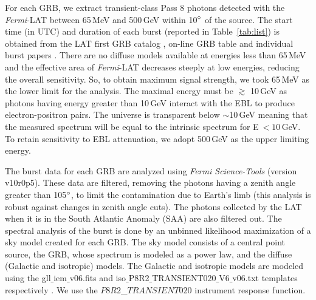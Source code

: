 \documentclass[12pt,preprint]{aastex}
\begin{document}
For each GRB, we {extract }transient-class Pass 8 photons detected with the {\it Fermi}-LAT 
between 65\,MeV and 500\,GeV within 10$\degree$ of the source.
The start time (in UTC) and duration of each burst (reported in Table~\ref{tab:list}) is obtained from
the LAT first GRB catalog \citep{lat_grbcat1}, on-line GRB
table\footnotemark{} and individual burst papers {\citep{lat_grb09,palmaetal,kd10,cutoff09,PLspect2013}}.
 {There are no diffuse models available at energies less than 65\,MeV and the effective area of {\it Fermi}-LAT decreases
steeply at low energies, reducing the overall sensitivity. So, to obtain maximum signal strength, we took 65\,MeV as the lower limit for the analysis.}
{The maximal energy }must be $\gtrsim$ 10\,GeV as photons having energy greater than 10\,GeV interact 
with the EBL to produce electron-positron pairs. The universe is transparent
below $\sim$10\,GeV \citep{stecker06} meaning that the measured
spectrum will {be} equal to the intrinsic spectrum for E$\ <10$\,GeV.
To retain sensitivity to EBL attenuation, we adopt 500\,GeV as the
upper limiting energy.




The burst data for each GRB are analyzed using {\it Fermi
Science-Tools} (version v10r0p5)\footnotemark{}.
These data are
filtered, removing the photons having a zenith angle greater than 105$\degree$,
to limit the
contamination due to Earth's limb {(this analysis is robust against changes in zenith angle cuts\footnotemark{})}.
The photons collected
by the LAT when it is in the South Atlantic Anomaly (SAA) are also filtered out. 
The spectral analysis of the burst is done by an unbinned likelihood maximization
of a sky model created for each GRB. The sky model consists of a central point source, 
the GRB, whose spectrum is modeled as a power law, and the diffuse (Galactic and isotropic) models.
The Galactic and isotropic models are modeled using the gll$\_$iem$\_$v06.fits and
iso$\_$P8R2$\_$TRANSIENT020$\_$V6$\_$v06.txt templates\footnotemark{}
respectively \citep{lat_diffuse_model16}.
 We {use} the $P8R2$\_$TRANSIENT020$ instrument response function.

\end{document}
